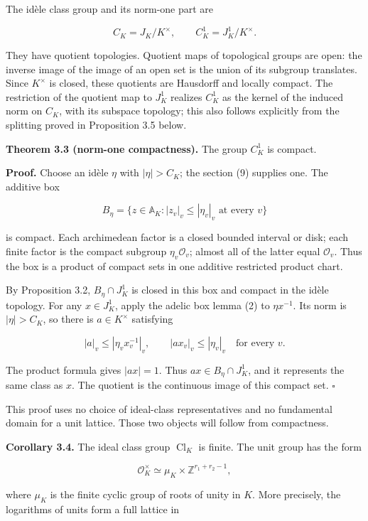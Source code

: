 \documentclass[
  english,
  11pt,
  a4paper,
]{article}
\begin{document}
The idèle class group and its norm-one part are

\[C_K=J_K/K^\times,
\qquad C_K^1=J_K^1/K^\times.
\tag{12}\]

They have quotient topologies. Quotient maps of topological groups are
open: the inverse image of the image of an open set is the union of its
subgroup translates. Since \(K^\times\) is closed, these quotients are
Hausdorff and locally compact. The restriction of the quotient map to
\(J_K^1\) realizes \(C_K^1\) as the kernel of the induced norm on
\(C_K\), with its subspace topology; this also follows explicitly from
the splitting proved in Proposition 3.5 below.

\textbf{Theorem 3.3 (norm-one compactness).} The group \(C_K^1\) is
compact.

\textbf{Proof.} Choose an idèle \(\eta\) with \(|\eta|>C_K\); the
section (9) supplies one. The additive box

\[B_\eta=\{z\in\mathbb A_K:|z_v|_v\leq |\eta_v|_v\text{ at every }v\}
\tag{13}\]

is compact. Each archimedean factor is a closed bounded interval or
disk; each finite factor is the compact subgroup \(\eta_v\mathcal O_v\);
almost all of the latter equal \(\mathcal O_v\). Thus the box is a
product of compact sets in one additive restricted product chart.

By Proposition 3.2, \(B_\eta\cap J_K^1\) is closed in this box and
compact in the idèle topology. For any \(x\in J_K^1\), apply the adelic
box lemma (2) to \(\eta x^{-1}\). Its norm is \(|\eta|>C_K\), so there
is \(a\in K^\times\) satisfying

\[|a|_v\leq |\eta_vx_v^{-1}|_v,
\qquad |ax_v|_v\leq|\eta_v|_v
\quad\text{for every }v.
\tag{14}\]

The product formula gives \(|ax|=1\). Thus \(ax\in B_\eta\cap J_K^1\),
and it represents the same class as \(x\). The quotient is the
continuous image of this compact set. \(\square\)

This proof uses no choice of ideal-class representatives and no
fundamental domain for a unit lattice. Those two objects will follow
from compactness.

\textbf{Corollary 3.4.} The ideal class group \(\operatorname{Cl}_K\) is
finite. The unit group has the form

\[\mathcal O_K^\times\simeq\mu_K\times\mathbb Z^{r_1+r_2-1},
\tag{15}\]

where \(\mu_K\) is the finite cyclic group of roots of unity in \(K\).
More precisely, the logarithms of units form a full lattice in
\end{document}
